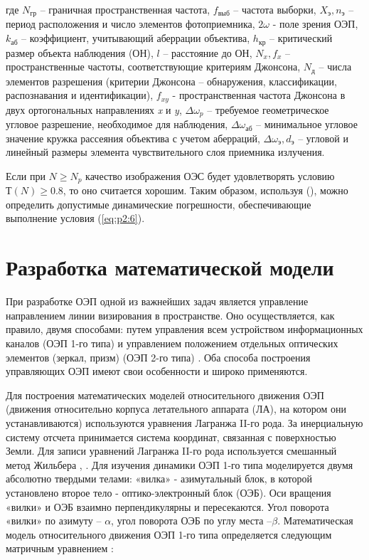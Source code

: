 где 
$N_{\textit{гр}}$ – граничная пространственная частота, 
$f_{\textit{выб}}$ – частота выборки, 
$X_{\textit{э}} ,n_{\textit{э}}$ –период расположения и число элементов фотоприемника, 
$2\omega$ - поле зрения ОЭП, 
$k_{\textit{аб}}$ – коэффициент, учитывающий аберрации объектива, 
$h_{\textit{кр}}$ – критический размер объекта наблюдения (ОН), 
$l$ – расстояние до ОН, 
$N_{x} , f_{x}$ – пространственные частоты, соответствующие критериям Джонсона, 
$N_{\textit{д}}$ – числа элементов разрешения (критерии Джонсона – обнаружения, классификации, распознавания и идентификации), 
$f_{xy}$ - пространственная частота Джонсона в двух ортогональных направлениях \textit{x} и \textit{y}, 
$\Delta{}{\omega{}}_p$ – требуемое геометрическое угловое разрешение, необходимое для наблюдения, 
$\Delta{}{\omega{}}_{\textit{аб}}$ – минимальное угловое значение кружка рассеяния объектива с учетом аберраций, 
$\Delta{}{\omega{}}_{\textit{э}} , d_{\textit{э}}$ – угловой и линейный размеры элемента чувствительного слоя приемника излучения. 

Если при $N \ge N_p$ качество изображения ОЭС будет удовлетворять условию $Т(N) \ge 0.8$, то оно считается хорошим. Таким образом, используя  (), можно определить допустимые динамические погрешности, обеспечивающие выполнение условия (\ref{eq:p2:6}).

\section{Разработка математической модели} \label{sec:ch2/sec3}

При разработке ОЭП одной из важнейших задач является управление направлением линии визирования в пространстве. Оно осуществляется, как правило, двумя способами: путем управления всем устройством информационных каналов (ОЭП 1-го типа) и управлением положением отдельных оптических элементов (зеркал, призм) (ОЭП 2-го типа) \cite[]{Karpov23}. Оба способа построения управляющих ОЭП имеют свои особенности и широко применяются.

Для построения математических моделей относительного движения ОЭП (движения относительно корпуса летательного аппарата (ЛА), на котором они устанавливаются) используются уравнения Лагранжа II-го рода. За инерциальную систему отсчета принимается система координат, связанная с поверхностью Земли. Для записи уравнений Лагранжа II-го рода используется смешанный метод Жильбера \cite[]{Belyakov}, \cite[]{Baloev16}. Для изучения динамики ОЭП 1-го типа моделируется двумя абсолютно твердыми телами: «вилка» - азимутальный блок, в которой установлено второе тело - оптико-электронный блок (ОЭБ). Оси вращения «вилки» и ОЭБ взаимно перпендикулярны и пересекаются. Угол поворота «вилки» по азимуту – $\alpha$, угол поворота ОЭБ по углу места –$\beta$. Математическая модель относительного движения ОЭП 1-го типа определяется следующим матричным уравнением \cite[]{Karpov23}:

